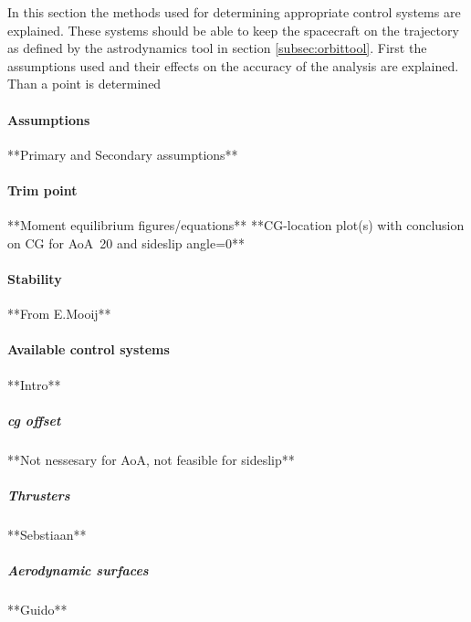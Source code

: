 In this section the methods used for determining appropriate control systems are explained. These systems should be able to keep the spacecraft on the trajectory as defined by the astrodynamics tool in section \ref{subsec:orbittool}. First the assumptions used and their effects on the accuracy of the analysis are explained. Than a point is determined

\paragraph{Assumptions}

**Primary and Secondary assumptions**

\paragraph{Trim point}

**Moment equilibrium figures/equations**
**CG-location plot(s)  with conclusion on CG for AoA~20 and sideslip angle=0**

\paragraph{Stability}

**From E.Mooij**

\paragraph{Available control systems}

**Intro**

\subparagraph{\acrfull{cg} offset}

**Not nessesary for AoA, not feasible for sideslip**

\subparagraph{Thrusters}

**Sebstiaan**

\subparagraph{Aerodynamic surfaces}

**Guido**



